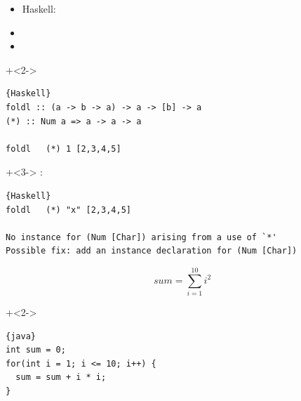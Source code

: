 \begin{frame}[fragile]{}
\begin{itemize}
\item Haskell: 
\item {}
\item {}
\end{itemize}

\onslide+<2->
\begin{lstlisting}{Haskell}
foldl :: (a -> b -> a) -> a -> [b] -> a
(*) :: Num a => a -> a -> a

foldl	(*) 1 [2,3,4,5]
\end{lstlisting}

\vfill

\onslide+<3->
:
\begin{lstlisting}{Haskell}
foldl	(*) "x" [2,3,4,5]

No instance for (Num [Char]) arising from a use of `*'
Possible fix: add an instance declaration for (Num [Char])
\end{lstlisting}

\end{frame}


\begin{frame}[fragile]{}

\[
sum = \sum_{i=1}^{10}i^2
\]

\vspace{5em}

\onslide+<2->
\begin{lstlisting}{java}
int sum = 0;
for(int i = 1; i <= 10; i++) {
  sum = sum + i * i;
}
\end{lstlisting}
\end{frame}

